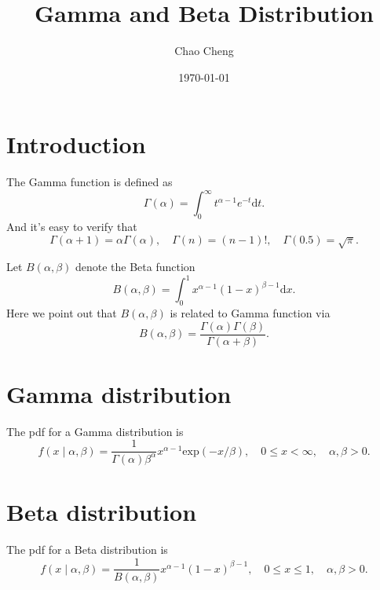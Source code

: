 \documentclass[a4paper,12pt]{article}
\title{Gamma and Beta Distribution}
\author{Chao Cheng}
\date{\today}
\begin{document}
\maketitle

\tableofcontents{}

\section{Introduction}
\label{sec:introduction}

The Gamma function is defined as
\begin{equation}
  \label{eq:gamma_def}
  \Gamma\left(\alpha\right)
  = \int_0^\infty t^{\alpha - 1}e^{-t}\mathrm{d}t
  .
\end{equation}
And it's easy to verify that
\[
  \Gamma\left(\alpha + 1\right) = \alpha\Gamma\left(\alpha\right)
  ,\quad
  \Gamma\left(n\right) = \left(n - 1\right)!
  ,\quad
  \Gamma\left(0.5\right) = \sqrt{\pi}
  .
\]

Let $B\left(\alpha, \beta\right)$ denote the Beta function
\begin{equation}
  \label{eq:beta_def}
  B\left(\alpha, \beta\right) =
  \int_0^1x^{\alpha - 1}\left(1 - x\right)^{\beta - 1}\mathrm{d}x
  .
\end{equation}
Here we point out that $B\left(\alpha, \beta\right)$ is related to Gamma function via
\[
  B\left(\alpha, \beta\right) =
  \frac{\Gamma\left(\alpha\right)\Gamma\left(\beta\right)}{\Gamma\left(\alpha + \beta\right)}
  .
\]

\section{Gamma distribution}
\label{sec:gamma-distribution}

The pdf for a Gamma distribution is
\begin{equation}
  \label{eq:gamma_pdf}
  f\left(x\middle|\alpha, \beta\right)
  = \frac{1}{\Gamma\left(\alpha\right)\beta^\alpha}
  x^{\alpha - 1}
  \mathrm{exp}\left(-x / \beta\right)
  ,\quad
  0 \leq x < \infty
  ,\quad
  \alpha, \beta > 0
  .
\end{equation}

\section{Beta distribution}
\label{sec:beta-distribution}

The pdf for a Beta distribution is
\begin{equation}
  \label{eq:beta_pdf}
  f\left(x\middle|\alpha, \beta\right) =
  \frac{1}{B\left(\alpha, \beta\right)}
  x^{\alpha - 1}\left(1 - x\right)^{\beta - 1}
  ,\quad
  0 \leq x \leq 1
  ,\quad
  \alpha, \beta > 0
  .
\end{equation}
\end{document}
